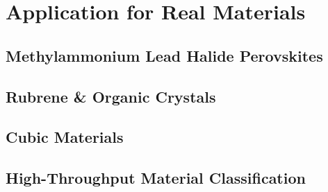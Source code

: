 \chapter{Application for Real Materials}
\label{chap:sixth}



\section{Methylammonium Lead Halide Perovskites}
\label{sec:chap-sixth-first}

\section{Rubrene \& Organic Crystals}
\label{sec:chap-sixth-second}

\section{Cubic Materials}
\label{sec:chap-sixth-third}

\section{High-Throughput Material Classification}
\label{sec:chap-sixth-fourth}